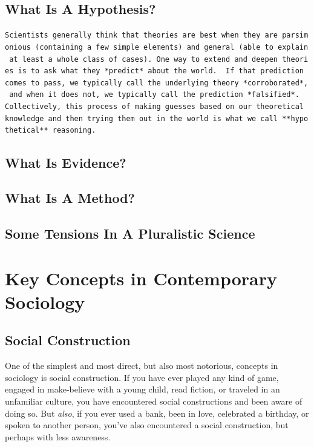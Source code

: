 \documentclass[
  letterpaper,
  DIV=11,
  numbers=noendperiod,
  oneside]{scrartcl}
\begin{document}
\subsection{What Is A Hypothesis?}\label{what-is-a-hypothesis}

\texttt{Scientists\ generally\ think\ that\ theories\ are\ best\ when\ they\ are\ parsimonious\ (containing\ a\ few\ simple\ elements)\ and\ general\ (able\ to\ explain\ at\ least\ a\ whole\ class\ of\ cases).\ One\ way\ to\ extend\ and\ deepen\ theories\ is\ to\ ask\ what\ they\ *predict*\ about\ the\ world.\ \ If\ that\ prediction\ comes\ to\ pass,\ we\ typically\ call\ the\ underlying\ theory\ *corroborated*,\ and\ when\ it\ does\ not,\ we\ typically\ call\ the\ prediction\ *falsified*.\ \ Collectively,\ this\ process\ of\ making\ guesses\ based\ on\ our\ theoretical\ knowledge\ and\ then\ trying\ them\ out\ in\ the\ world\ is\ what\ we\ call\ **hypothetical**\ reasoning.}

\subsection{What Is Evidence?}\label{what-is-evidence}

\subsection{What Is A Method?}\label{what-is-a-method}

\subsection{Some Tensions In A Pluralistic
Science}\label{some-tensions-in-a-pluralistic-science}

\section{Key Concepts in Contemporary
Sociology}\label{key-concepts-in-contemporary-sociology}

\subsection{Social Construction}\label{social-construction}

One of the simplest and most direct, but also most notorious, concepts
in sociology is social construction. If you have ever played any kind of
game, engaged in make-believe with a young child, read fiction, or
traveled in an unfamiliar culture, you have encountered social
constructions and been aware of doing so. But \emph{also}, if you ever
used a bank, been in love, celebrated a birthday, or spoken to another
person, you've also encountered a social construction, but perhaps with
less awareness.
\end{document}
